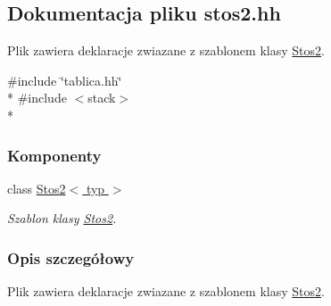 \hypertarget{stos2_8hh}{\subsection{Dokumentacja pliku stos2.\-hh}
\label{stos2_8hh}
}


Plik zawiera deklaracje zwiazane z szablonem klasy \hyperlink{class_stos2}{Stos2}.  


{\ttfamily \#include \char`\"{}tablica.\-hh\char`\"{}}\\*
{\ttfamily \#include $<$stack$>$}\\*
\subsubsection*{Komponenty}
\begin{DoxyCompactItemize}
\item 
class \hyperlink{class_stos2}{Stos2$<$ typ $>$}
\begin{DoxyCompactList}\small\item\em Szablon klasy \hyperlink{class_stos2}{Stos2}. \end{DoxyCompactList}\end{DoxyCompactItemize}


\subsubsection{Opis szczegółowy}
Plik zawiera deklaracje zwiazane z szablonem klasy \hyperlink{class_stos2}{Stos2}. 